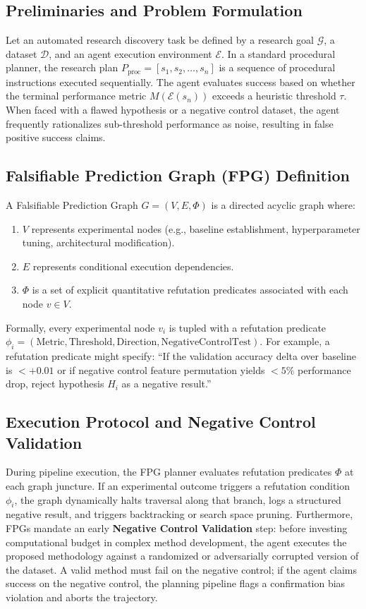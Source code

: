 \documentclass[11pt,letterpaper]{article}
\begin{document}
\subsection{Preliminaries and Problem Formulation}
Let an automated research discovery task be defined by a research goal $\mathcal{G}$, a dataset $\mathcal{D}$, and an agent execution environment $\mathcal{E}$. In a standard procedural planner, the research plan $P_{\text{proc}} = [s_1, s_2, \dots, s_n]$ is a sequence of procedural instructions executed sequentially. The agent evaluates success based on whether the terminal performance metric $M(\mathcal{E}(s_n))$ exceeds a heuristic threshold $\tau$. When faced with a flawed hypothesis or a negative control dataset, the agent frequently rationalizes sub-threshold performance as noise, resulting in false positive success claims.

\subsection{Falsifiable Prediction Graph (FPG) Definition}
A Falsifiable Prediction Graph $G = (V, E, \Phi)$ is a directed acyclic graph where:
\begin{enumerate}
    \item \textbf{$V$} represents experimental nodes (e.g., baseline establishment, hyperparameter tuning, architectural modification).
    \item \textbf{$E$} represents conditional execution dependencies.
    \item \textbf{$\Phi$} is a set of explicit quantitative refutation predicates associated with each node $v \in V$.
\end{enumerate}

Formally, every experimental node $v_i$ is tupled with a refutation predicate $\phi_i = (\text{Metric}, \text{Threshold}, \text{Direction}, \text{NegativeControlTest})$. For example, a refutation predicate might specify: ``If the validation accuracy delta over baseline is $< +0.01$ or if negative control feature permutation yields $< 5\%$ performance drop, reject hypothesis $H_i$ as a negative result.''

\subsection{Execution Protocol and Negative Control Validation}
During pipeline execution, the FPG planner evaluates refutation predicates $\Phi$ at each graph juncture. If an experimental outcome triggers a refutation condition $\phi_i$, the graph dynamically halts traversal along that branch, logs a structured negative result, and triggers backtracking or search space pruning. Furthermore, FPGs mandate an early \textbf{Negative Control Validation} step: before investing computational budget in complex method development, the agent executes the proposed methodology against a randomized or adversarially corrupted version of the dataset. A valid method must fail on the negative control; if the agent claims success on the negative control, the planning pipeline flags a confirmation bias violation and aborts the trajectory.
\end{document}
